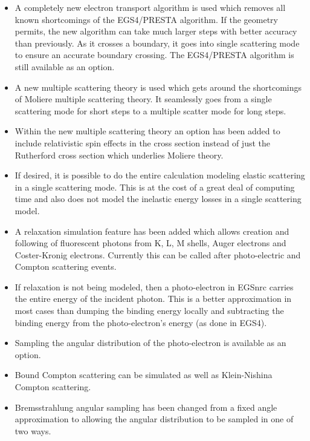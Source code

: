 \begin{itemize} 
\item A completely new electron transport algorithm is used which removes
all known shortcomings of the EGS4/PRESTA algorithm.  If the geometry
permits, the new algorithm can take much larger steps with better accuracy
than previously. As it crosses a boundary, it goes into single scattering
mode to ensure an accurate boundary crossing. The EGS4/PRESTA algorithm
is still available as an option.

\item A new multiple scattering theory is used which gets around the
shortcomings of Moliere multiple scattering theory. It seamlessly goes from
a single scattering mode for short steps to a multiple scatter mode for
long steps.

\item Within the new multiple scattering theory an option has been added to
include relativistic spin effects in the cross section instead of just the
Rutherford cross section which underlies Moliere theory.

\item If desired, it is possible to do the entire calculation modeling
elastic scattering in a single scattering mode. This is at the cost of a
great deal of computing time and also does not model the inelastic energy
losses in a single scattering model.

\item A relaxation simulation feature has been added which allows creation
and following of fluorescent photons from K, L, M shells, Auger electrons and
Coster-Kronig electrons. Currently this can be called after photo-electric
and Compton scattering events.

\item If relaxation is not being modeled, then a photo-electron in EGSnrc
carries the entire energy of the incident photon. This is a better
approximation in most cases than dumping the binding energy locally and
subtracting the binding energy from the photo-electron's energy (as done in
EGS4).

\item Sampling the angular distribution of the photo-electron is available
as an option.

\item Bound Compton scattering can be simulated as well as Klein-Nishina
Compton scattering.

\item Bremsstrahlung angular sampling has been changed from a fixed angle
approximation to allowing the angular distribution to be sampled in one of
two ways.


\end{itemize}
